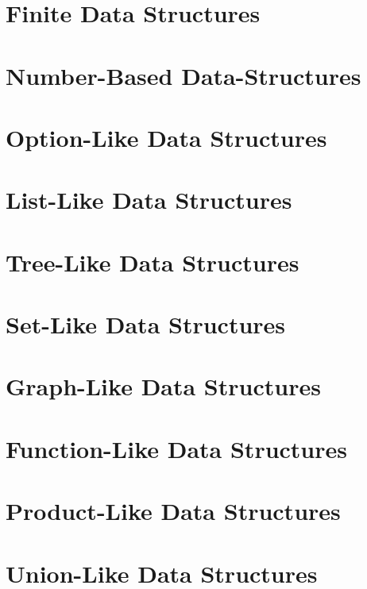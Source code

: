 \documentclass{book}
\begin{document}
\chapter{Finite Data Structures}\label{sec:ad:finiteds}
 


\chapter{Number-Based Data-Structures}\label{sec:ad:numbers}
 

\chapter{Option-Like Data Structures}\label{sec:ad:option}
 

\chapter{List-Like Data Structures}\label{sec:ad:lists}
 

\chapter{Tree-Like Data Structures}\label{sec:ad:trees}
 

\chapter{Set-Like Data Structures}\label{sec:ad:sets}
 

\chapter{Graph-Like Data Structures}\label{sec:ad:graphs}
 

\chapter{Function-Like Data Structures}\label{sec:ad:functions}
 

\chapter{Product-Like Data Structures}\label{sec:ad:products}
 

\chapter{Union-Like Data Structures}\label{sec:ad:unions}
 
\end{document}
